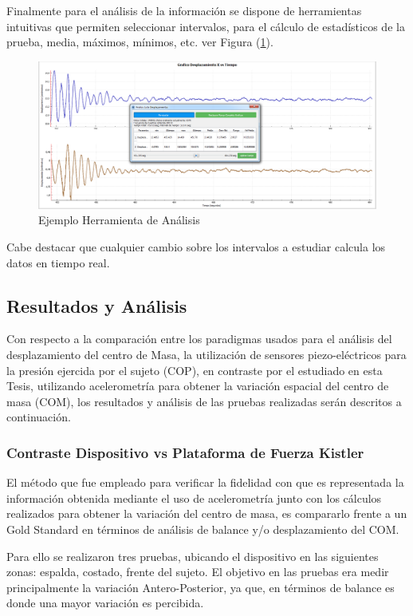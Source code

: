 \documentclass[12pt,a4paper]{article}
\begin{document}
Finalmente para el análisis de la información se dispone de herramientas intuitivas que permiten seleccionar intervalos, para el cálculo de estadísticos de la prueba, media, máximos, mínimos, etc. ver Figura (\ref{fig:analsisGraficos}).

\begin{figure}[H]
	\centering
	\includegraphics[scale=0.3]{images/analisisGraficos}
	\caption{Ejemplo Herramienta de Análisis}
	\label{fig:analsisGraficos}
\end{figure}

Cabe destacar que cualquier cambio sobre los intervalos a estudiar calcula los datos en tiempo real.

\newpage
\subsection{Resultados y Análisis}
Con respecto a la comparación entre los paradigmas usados para el análisis del desplazamiento del centro de Masa, la utilización de sensores piezo-eléctricos para la presión ejercida por el sujeto (COP), en contraste por el estudiado en esta Tesis, utilizando acelerometría para obtener la variación espacial del centro de masa (COM), los resultados y análisis de las pruebas realizadas serán descritos a continuación.

\subsubsection{Contraste Dispositivo vs Plataforma de Fuerza Kistler}

El método que fue empleado para verificar la fidelidad con que es representada la información obtenida mediante el uso de acelerometría junto con los cálculos realizados para obtener la variación del centro de masa, es compararlo frente a un Gold Standard en términos de análisis de balance y/o desplazamiento del COM.

Para ello se realizaron tres pruebas, ubicando el dispositivo en las siguientes zonas: espalda, costado, frente del sujeto.
El objetivo en las pruebas era medir principalmente la variación Antero-Posterior, ya que, en términos de balance es donde una mayor variación es percibida.
\end{document}
